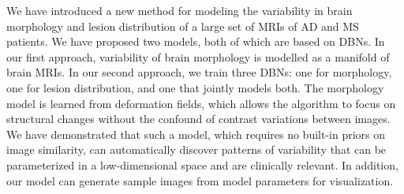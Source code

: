 We have introduced a new method for modeling the variability in brain morphology
and lesion distribution of a large set of MRIs of AD and MS patients. We have
proposed two models, both of which are based on DBNs. In our first approach,
variability of brain morphology is modelled as a manifold of brain MRIs. In our
second approach, we train three DBNs: one for morphology, one for lesion
distribution, and one that jointly models both. The morphology model is learned
from deformation fields, which allows the algorithm to focus on structural
changes without the confound of contrast variations between images. We have
demonstrated that such a model, which requires no built-in priors on image
similarity, can automatically discover patterns of variability that can be
parameterized in a low-dimensional space and are clinically relevant. In
addition, our model can generate sample images from model parameters for
visualization. 

